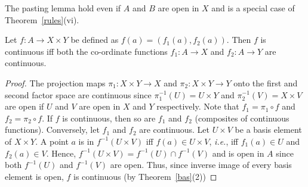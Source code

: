 \documentclass[a4paper,english,12pt]{article}
\begin{document}
The pasting lemma hold even if $A$ and $B$ are open in $X$ and is a special case of Theorem~\ref{rules}(vi).

\begin{thm}
Let $f:A\to X\times Y$ be defined as $f(a)=(f_1(a),f_2(a))$. Then $f$ is continuous iff both the co-ordinate functions $f_1:A\to X$ and $f_2:A\to Y$ are continuous.
\end{thm}
\begin{proof}
The projection maps $\pi_1:X\times Y\to X$ and $\pi_2:X\times Y\to Y$ onto the first and second factor space are continuous since $\pi_1^{-1}(U)=U\times Y$ and $\pi_2^{-1}(V)=X\times V$ are open if $U$ and $V$ are open in $X$ and $Y$ respectively. Note that $f_1=\pi_1\circ f$ and $f_2=\pi_2\circ f$.
If $f$ is continuous, then so are $f_1$ and $f_2$ (composites of continuous functions).
Conversely, let $f_1$ and $f_2$ are continuous. Let $U\times V$ be a basis element of  $X\times Y$. A point $a$ is in $f^{-1}(U\times V)$ iff $f(a)\in U\times V$, \emph{i.e.}, iff $f_1(a)\in U$ and $f_2(a)\in V$. Hence, $f^{-1}(U\times V)=f^{-1}(U)\cap f^{-1}(V)$ and is open in $A$ since both $f^{-1}(U)$ and $f^{-1}(V)$ are open. Thus, since inverse image of every basis element is open, $f$ is continuous (by Theorem~\ref{bas}(2))
\end{proof}
\end{document}
